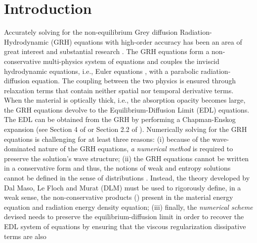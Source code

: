 \documentclass[times]{fldauth}
\begin{document}
\section{Introduction}
\label{sec:intro}
%
Accurately solving for the non-equilibrium Grey diffusion Radiation-Hydrodynamic (GRH) equations with 
high-order accuracy has been an area of great interest and substantial research \cite{Balsara,LowrieMorelHittinger,EdwardsMorelLowrie}
 . 
The GRH equations form a non-conservative multi-physics system of equations and couples the inviscid 
hydrodynamic equations, i.e., Euler equations \cite{toro} , with a parabolic 
radiation-diffusion equation. The coupling between the two physics is ensured through relaxation terms
that contain neither spatial nor temporal derivative terms. When the material is optically thick, i.e., 
the absorption opacity becomes large, the GRH equations devolve to the Equilibrium-Diffusion Limit (EDL) 
equations. The EDL can be obtained from the GRH by performing a Chapman-Enskog expansion (see Section 4 of \cite{LowrieMorel} or Section 2.2 of \cite{our_jcp_radhy_paper}).
Numerically solving for the GRH equations is challenging for at least three reasons: (i) because of the 
wave-dominated nature of the GRH equations, \emph{a numerical method} is required to preserve the 
solution's wave structure; 
(ii) the GRH equations cannot be written in a conservative form and thus, the notions of weak and entropy 
solutions cannot be defined in the sense of distributions \cite{dlm, lefloch_1988, lefloch_1989, lefloch_liu_1993, bianchini_bressan_2005}  . Instead, the theory developed by Dal Maso, Le Floch and Murat (DLM) must be used to
rigorously define, in a weak sense, the non-conservative products (\cite{dlm}) present in the material energy equation 
and radiation energy density equation;
(iii) finally, the \emph{numerical scheme} devised needs to preserve the equilibrium-diffusion limit in order to recover the EDL system of equations by ensuring that the viscous regularization dissipative terms are also
\end{document}
